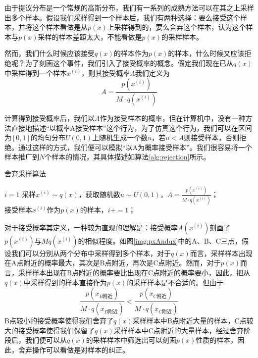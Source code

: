 由于提议分布是一个常规的高斯分布，我们有一系列的成熟方法可以在其之上采样出多个样本。假设我们采样得到一个样本后，我们有两种选择：要么接受这个样本，并将这个样本看做是从$p(x)$上采样得到的，要么舍弃这个样本，认为这个样本与$p(x)$采样的样本差距太大，不能看做是$p(x)$的采样样本。

然而，我们什么时候应该接受$q(x)$的样本作为$p(x)$的样本，什么时候又应该拒绝呢？为了刻画这个事件，我们引入了接受概率的概念。假定我们现在已从$q(x)$中采样得到一个样本$x^{(i)}$，则其接受概率$A$我们定义为
\begin{equation}
A = \frac{p(x^{(i)})}{M\cdot q(x^{(i)})}
\end{equation}

计算得到接受概率后，我们以$A$作为接受样本的概率，但在计算机中，没有一种方法直接地描述“以概率A接受样本”这个行为，为了仿真这个行为，我们可以在区间为$[0, 1]$的均匀分布$U(0,1)$上随机生成一个数$u$，若$u<A$则接受样本，否则拒绝。通过这样的方式，我们便可以模拟“以A为概率接受样本”。我们很容易将一个样本推广到$N$个样本的情况，其具体描述如算法\ref{alg:rejection}所示。

\vspace{1em}
\begin{minipage}{0.8\textwidth}\centering
\begin{algorithm}[H]\label{alg:rejection}
 \caption{舍弃采样算法}
$i=1$\;
{
采样$x^{(i)}\sim q(x)$，获取随机数$u\sim U(0,1)$，$A = \frac{p(x^{(i)})}{M\cdot q(x^{(i)})}$；\\
{
接受样本$x^{(i)}$作为$p(x)$的样本，$i += 1$；\\
}
}
\end{algorithm}
\end{minipage}
\vspace{1em}

对于接受概率其定义，一种较为直观的理解是：接受概率$A(x^{(i)})$刻画了$p(x^{(i)})$与$Mq(x^{(i)})$的相似程度。如图\ref{img:pxAndqx}中的A、B、C三点，假设我们可以分别从两个分布中采样得到多个样本，对于$q(x)$而言，采样样本出现在A点附近的概率最大，其次是B点附近，再次是C点附近。然而，对于$p(x)$而言，采样样本出现在B点附近的概率要比出现在C点附近的概率要小，因此，把从$q(x)$中采样得到的样本直接作为$p(x)$的采样样本是不合适的。但由于
\begin{equation}
\frac{p(x_{B\text{附近}})}{M\cdot q(x_{B\text{附近}})} < \frac{p(x_{C\text{附近}})}{M\cdot q(x_{C\text{附近}})}
\end{equation}
B点较小的接受概率使得我们舍弃了$q(x)$采样样本中B点附近大量的样本，C点较大的接受概率使得我们保留了$q(x)$采样样本中C点附近的大量样本，经过舍弃阶段后，我们便可以从$q(x)$的采样样本中筛选出可以刻画$p(x)$性质的样本，因此，舍弃操作可以看做是对样本的纠正。

